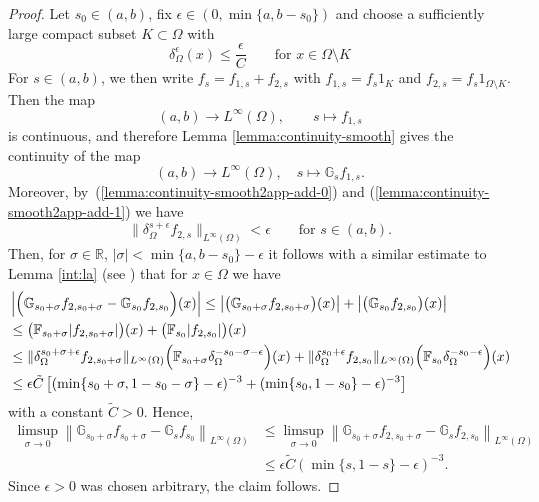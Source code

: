 \documentclass[notitlepage,11pt,reqno]{amsart}
\theoremstyle{definition}
\numberwithin{equation}{section}
\newcommand{\cGs}{{\mathbb G}}
\newcommand{\cFs}{{\mathbb F}}
\newcommand{\R}{\mathds{R}}
\begin{document}
\begin{proof}
  Let $s_0\in(a,b)$, fix $\epsilon\in(0,\min\{a,b-s_0\})$ and choose a sufficiently large compact subset $K \subset \Omega$ with
  \begin{equation}
    \label{lemma:continuity-smooth2app-add-1}
    \delta_\Omega^{\epsilon}(x) \le \frac{\epsilon}{C} \qquad \text{for $x \in \Omega \setminus K$}
\end{equation}
For $s \in (a,b)$, we then write $f_s=f_{1,s}+f_{2,s}$ with $f_{1,s} = f_s 1_K$ and $f_{2,s} = f_s 1_{\Omega \setminus K}$. Then the map
$$
(a,b) \to L^\infty(\Omega), \qquad s \mapsto f_{1,s}
$$
is continuous, and therefore Lemma \ref{lemma:continuity-smooth} gives the continuity of the map
$$
(a,b)\to L^{\infty}(\Omega),\quad s\mapsto \cGs_s f_{1,s}.
$$
Moreover, by~(\ref{lemma:continuity-smooth2app-add-0}) and (\ref{lemma:continuity-smooth2app-add-1}) we have 
  \begin{equation}
    \label{lemma:continuity-smooth2app-add-2}
\|\delta_{\Omega}^{s+\epsilon}f_{2,s}\|_{L^\infty(\Omega)}<\epsilon \qquad \text{for $s \in (a,b)$.}
\end{equation}
Then, for $\sigma\in \R$, $|\sigma|<\min\{a,b-s_0\}-\epsilon$ it follows with a similar estimate to Lemma \ref{int:la} (see \cite[Lemma 2.5]{JSW20}) that for $x\in \Omega$ we have
\begin{align*}
  &\left|\Bigl(\cGs_{{s_0}+\sigma}f_{2,{s_0+\sigma}}-\cGs_{s_0}f_{2,{s_0}}\Bigr)(x)\right|\leq  \left|\bigl(\cGs_{{s_0}+\sigma}f_{2,{s_0+\sigma}}\bigr)(x)\right|+\left|\bigl(\cGs_{s_0}f_{2,{s_0}}\bigr)(x)\right|\\
                                                                                         &\le \bigl(\cFs_{{s_0}+\sigma}|f_{2,{s_0+\sigma}}|\bigr)(x)+\bigl(\cFs_{s_0}|f_{2,{s_0}}|\bigr)(x)\\                                                                  &\le \|\delta_{\Omega}^{s_0+\sigma +\epsilon}f_{2,{s_0+\sigma}}\|_{L^\infty(\Omega)} \Bigl(\cFs_{s_0+\sigma}\delta_{\Omega}^{-s_0-\sigma-\epsilon}\Bigr)(x)+            \|\delta_{\Omega}^{s_0+\epsilon}f_{2,{s_0}}\|_{L^\infty(\Omega)} \Bigl(\cFs_{s_0}\delta_{\Omega}^{-s_0-\epsilon}\Bigr)(x)  \\
&\leq \epsilon \tilde C\left[(\min\{s_0+\sigma,1-s_0-\sigma\}-\epsilon)^{-3}+(\min\{s_0,1-s_0\}-\epsilon)^{-3}\right]
\end{align*}
with a constant $\tilde C>0$. Hence,
\begin{align*}
\limsup_{\sigma\to0}
  \left\|\cGs_{s_0+\sigma}f_{s_0+\sigma}-\cGs_s f_{s_0}\right\|_{L^{\infty}(\Omega)}&\leq \limsup_{\sigma\to 0}\left\|\cGs_{s_0+\sigma}f_{2,s_0+\sigma}-\cGs_s f_{2,s_0}\right\|_{L^{\infty}(\Omega)}\\
  &\leq \epsilon \tilde C(\min\{s,1-s\}-\epsilon)^{-3}.
\end{align*}
Since $\epsilon>0$ was chosen arbitrary, the claim follows.
\end{proof}
\end{document}
